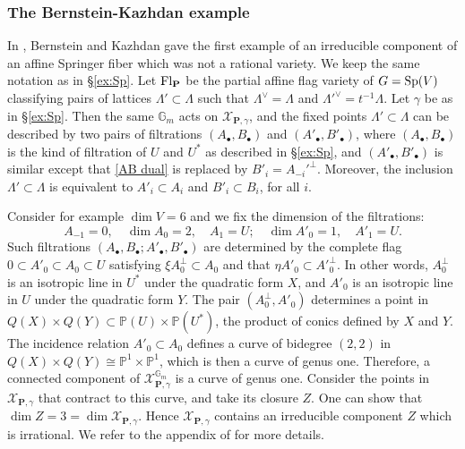 \documentclass[]{pcmi}
\let\oldsubsubsection\subsubsection
\renewcommand{\subsubsection}[1]{%
\setcounter{subsubsection}{\value{equation}}%
\oldsubsubsection{#1}%
\refstepcounter{equation}%
}
\theoremstyle{plain}
\theoremstyle{definition}
\def\GG{\mathbb{G}}
\def\PP{\mathbb{P}}
\newcommand{\sX}{\ensuremath{\mathscr{X}}\xspace}
\newcommand{\sX}{\ensuremath{\mathcal{X}}\xspace}
\def\bP{\mathbf{P}}
\newcommand{\Fl}{\textup{Fl}}
\newcommand\Sp{\textup{Sp}}
\newcommand{\Gm}{\GG_m}
\renewcommand{\L}{\Lambda}
\newcommand\bu{\bullet}
\begin{document}
\subsubsection{The Bernstein-Kazhdan example}\label{sss:BK example} In \cite[Appendix]{KL}, Bernstein and Kazhdan gave the first example of an irreducible component of an affine Springer fiber which was not a rational variety. We keep the same notation as in \S\ref{ex:Sp}. Let $\Fl_{\bP}$ be the partial affine flag variety of $G=\Sp(V)$ classifying pairs of lattices $\L'\subset\L$ such that $\L^{\vee}=\L$ and $\L'^{\vee}=t^{-1}\L$.
Let $\gamma$ be as in \S\ref{ex:Sp}. Then the same $\Gm$ acts on $\sX_{\bP,\gamma}$, and the fixed points $\L'\subset \L$ can be described by two pairs of filtrations $(A_{\bu}, B_{\bu})$ and $(A'_{\bu}, B'_{\bu})$, where $(A_{\bu}, B_{\bu})$ is the kind of filtration of $U$ and $U^{*}$ as described in \S\ref{ex:Sp}, and $(A'_{\bu}, B'_{\bu})$ is similar except that \eqref{AB dual} is replaced by $B'_{i}=A_{-i}'^{\bot}$. Moreover, the inclusion $\L'\subset \L$ is equivalent to $A'_{i}\subset A_{i}$ and $B'_{i}\subset B_{i}$, for all $i$.

Consider for example $\dim V=6$ and we fix the dimension of the filtrations:
\begin{equation*}
A_{-1}=0, \quad \dim A_{0}=2, \quad A_{1}=U;\quad  \dim A'_{0}=1, \quad A'_{1}=U.
\end{equation*}
Such filtrations $(A_{\bu}, B_{\bu}; A'_{\bu}, B'_{\bu})$ are determined by the complete flag $0\subset A'_{0}\subset A_{0}\subset U$ satisfying $\xi A^{\bot}_{0}\subset A_{0}$ and that $\eta A'_{0}\subset A'^{\bot}_{0}$. In other words,  $A^{\bot}_{0}$ is an isotropic line in $U^{*}$ under the quadratic form $X$, and $A'_{0}$ is an isotropic line in $U$ under the quadratic form $Y$. The pair $(A^{\bot}_{0}, A'_{0})$ determines a point in $Q(X)\times Q(Y)\subset \PP(U)\times\PP(U^{*})$, the product of conics defined by $X$ and $Y$. The incidence relation $A'_{0}\subset A_{0}$ defines a curve of bidegree $(2,2)$ in $Q(X)\times Q(Y)\cong\PP^{1}\times \PP^{1}$, which is then a curve of genus one. Therefore, a connected component of $\sX^{\Gm}_{\bP,\gamma}$ is a curve of genus  one. Consider the points in $\sX_{\bP,\gamma}$ that contract to this curve, and take its closure $Z$. One can show that $\dim Z=3=\dim\sX_{\bP,\gamma}$. Hence $\sX_{\bP,\gamma}$ contains an irreducible component $Z$ which is irrational. We refer to the appendix of \cite{KL} for more details.
\end{document}
